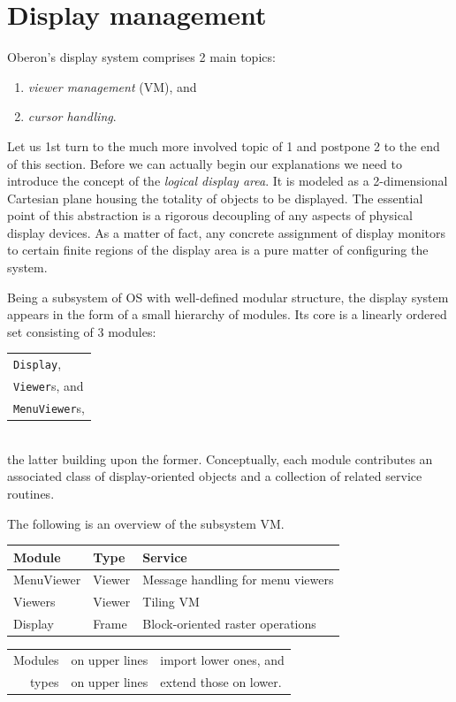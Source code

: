 \section{Display management}
\label{sec:dispmanagement}
Oberon's display system comprises 2 main topics:
\begin{enumerate}
  \item \emph{viewer management} (VM), and
  \item \emph{cursor handling}.
\end{enumerate}
Let us 1st turn to the much more involved topic of 1 and postpone 2 to the end of this section.
Before we can actually begin our explanations
we need to introduce the concept of the \emph{logical display area}.
It is modeled as a 2-dimensional Cartesian plane
housing the totality of objects to be displayed.
The essential point of this abstraction is a rigorous decoupling
of any aspects of physical display devices.  As a matter of fact,
any concrete assignment of display monitors to certain finite regions of the display area
is a pure matter of configuring the system.

Being a subsystem of OS with well-defined modular structure,
the display system appears in the form of a small hierarchy of modules.
Its core is a linearly ordered set consisting of 3 modules:
\begin{table}[h!]
  \centering
  \begin{tabular}{l}
    \verb|Display|, \\
    \verb|Viewer|s, and \\
    \verb|MenuViewer|s,
  \end{tabular}
\end{table}
\\the latter building upon the former.  Conceptually, each module contributes
an associated class of display-oriented objects and a collection of related service routines.

The following is an overview of the subsystem VM.
\begin{table}[h!]
  \setlength{\tabcolsep}{2pt}
  \begin{tabular}{l|l|l}
    Module     &Type   &Service \\\hline
    MenuViewer &Viewer &Message handling for menu viewers \\
    Viewers    &Viewer &Tiling VM \\
    Display    &Frame  &Block-oriented raster operations
  \end{tabular}
\end{table}
\begin{table}[h!]
  \setlength{\tabcolsep}{2pt}
  \begin{tabular}{r l l}
    Modules&on upper lines&import lower ones, and \\
      types&on upper lines&extend those on lower.
  \end{tabular}
\end{table}

